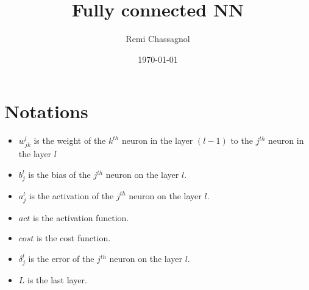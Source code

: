 \documentclass[a4paper]{article}
\title{Fully connected NN}
\author{Remi Chassagnol}
\date{\today}
\begin{document}
\newcommand{\ajl}{a_{j}^{l}}
\newcommand{\ajll}{a_{j}^{l-1}}
\newcommand{\akll}{a_{k}^{l-1}}
\newcommand{\ajL}{a_{j}^{L}}
\newcommand{\akL}{a_{k}^{L}}
\newcommand{\aL}{a^{L}}

\newcommand{\zjl}{z_{j}^{l}}
\newcommand{\zjll}{z_{j}^{l-1}}
\newcommand{\zl}{z^{l}}
\newcommand{\zlp}{z^{l+1}}
\newcommand{\zklp}{z_{k}^{l+1}}
\newcommand{\zjL}{z_{j}^{L}}
\newcommand{\zkL}{z_{k}^{L}}
\newcommand{\zL}{z^{L}}

\newcommand{\wjkl}{w_{jk}^{l}}
\newcommand{\wjkll}{w_{jk}^{l-1}}
\newcommand{\wjklp}{w_{jk}^{l+1}}
\newcommand{\wlp}{w^{l+1}}

\newcommand{\bjl}{b_{j}^{l}}
\newcommand{\bjll}{b_{j}^{l-1}}

\newcommand{\errjl}{\delta_{j}^{l}}
\newcommand{\errjll}{\delta_{j}^{l-1}}
\newcommand{\errl}{\delta^{l}}
\newcommand{\errlp}{\delta^{l+1}}
\newcommand{\errklp}{\delta_{k}^{l+1}}
\newcommand{\errjL}{\delta_{j}^{L}}
\newcommand{\errL}{\delta^{L}}

\maketitle

\section{Notations}

\begin{itemize}
  \item $\wjkl$ is the weight of the $k^{th}$ neuron in the layer $(l - 1)$
    to the $j^{th}$ neuron in the layer $l$
  \item $\bjl$ is the bias of the $j^{th}$ neuron on the layer $l$.
  \item $\ajl$ is the activation of the $j^{th}$ neuron on the layer $l$.
  \item $act$ is the activation function.
  \item $cost$ is the cost function.
  \item $\errjl$ is the error of the $j^{th}$ neuron on the layer $l$.
  \item $L$ is the last layer.
\end{itemize}

\begin{center}
\end{center}
\end{document}
